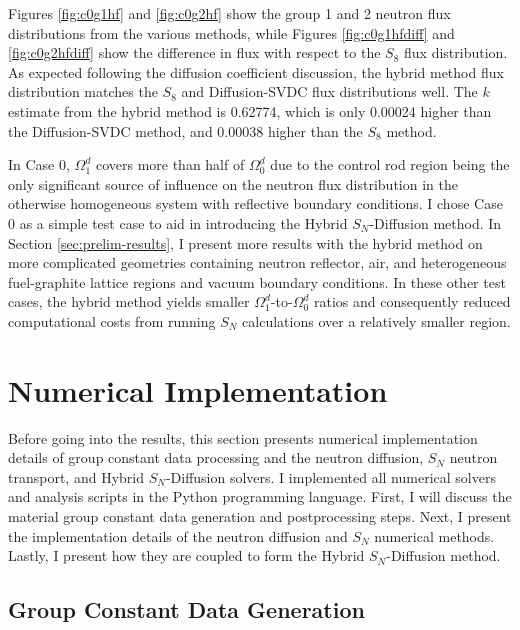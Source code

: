 Figures \ref{fig:c0g1hf} and \ref{fig:c0g2hf} show the group 1 and 2 neutron flux distributions
from the various methods, while Figures \ref{fig:c0g1hfdiff} and \ref{fig:c0g2hfdiff} show the
difference in flux with respect to the $S_8$ flux distribution. As
expected following the diffusion coefficient discussion, the hybrid method flux distribution
matches the $S_8$ and Diffusion-\gls{SVDC} flux distributions well. The $k$ estimate from the
hybrid method is 0.62774, which is only 0.00024 higher than the Diffusion-\gls{SVDC} method, and
0.00038 higher than the $S_8$ method.

In Case 0, $\Omega^d_1$ covers more than half of $\Omega^d_0$ due to the control rod region being
the only significant source of influence on the neutron flux distribution in the
otherwise homogeneous system with reflective boundary conditions. I chose Case 0 as a simple test
case to aid in introducing the Hybrid $S_N$-Diffusion method. In Section \ref{sec:prelim-results},
I present more results with the hybrid method on more complicated geometries containing neutron
reflector, air, and heterogeneous fuel-graphite lattice regions and vacuum boundary conditions. In
these other test cases, the hybrid method yields smaller $\Omega^d_1$-to-$\Omega^d_0$ ratios and
consequently reduced computational costs from running $S_N$ calculations over a relatively smaller
region.

\section{Numerical Implementation} \label{sec:implementation}

Before going into the results, this section presents numerical implementation details of group
constant data processing and the neutron diffusion, $S_N$ neutron transport, and Hybrid
$S_N$-Diffusion solvers. I implemented all numerical solvers and analysis scripts in the Python
programming language. First, I will discuss the material group constant data generation and
postprocessing steps. Next, I present the implementation details of the neutron
diffusion and $S_N$ numerical methods. Lastly, I present how they are coupled to form the Hybrid
$S_N$-Diffusion method.

\subsection{Group Constant Data Generation}

